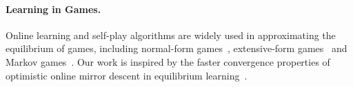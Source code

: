 \paragraph{Learning in Games.} Online learning and self-play algorithms are widely used in approximating the equilibrium of games, including normal-form games~\citep{freund1999adaptive,daskalakis2011near,mai2018cycles,roy2019online,chen2020hedging,wei2020linear,daskalakis2021near}, extensive-form games~\citep{zinkevich2007regret,kroer2020faster,kozuno2021model,lee2021last,bai2022near} and Markov games~\citep{wei2017online,jin2021v,liu2021sharp,mao2023provably}. Our work is inspired by the faster convergence properties of optimistic online mirror descent in equilibrium learning~\citep{rakhlin2013optimization,syrgkanis2015fast}.

